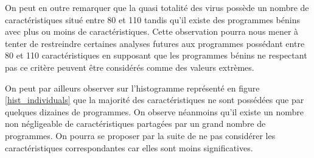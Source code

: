 \documentclass[11pt,a4paper]{article}
\begin{document}
	On peut en outre remarquer que la quasi totalité des virus possède un nombre de caractéristiques situé entre 80 et 110 tandis qu'il existe des programmes bénins avec plus ou moins de caractéristiques. Cette observation pourra nous mener à tenter de restreindre certaines analyses futures aux programmes possédant entre 80 et 110 caractéristiques en supposant que les programmes bénins ne respectant pas ce critère peuvent être considérés comme des valeurs extrèmes.

	On peut par ailleurs observer sur l'histogramme représenté en figure \ref{hist_individuals} que la majorité des caractéristiques ne sont possédées que par quelques dizaines de programmes. On observe néanmoins qu'il existe un nombre non négligeable de caractéristiques partagées par un grand nombre de programmes. On pourra se proposer par la suite de ne pas considérer les caractéristiques correspondantes car elles sont moins significatives.
\end{document}
